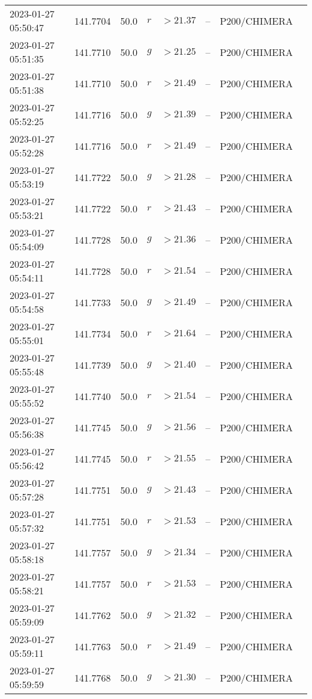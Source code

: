 \documentclass{nature_plusfigure}
\begin{document}
\begin{supplement}
\begin{center}
\begin{longtable}{llllllll}
2023-01-27 05:50:47 & 141.7704 & 50.0 & $r$ & $>21.37$ & -- & P200/CHIMERA &  \\ 
2023-01-27 05:51:35 & 141.7710 & 50.0 & $g$ & $>21.25$ & -- & P200/CHIMERA &  \\ 
2023-01-27 05:51:38 & 141.7710 & 50.0 & $r$ & $>21.49$ & -- & P200/CHIMERA &  \\ 
2023-01-27 05:52:25 & 141.7716 & 50.0 & $g$ & $>21.39$ & -- & P200/CHIMERA &  \\ 
2023-01-27 05:52:28 & 141.7716 & 50.0 & $r$ & $>21.49$ & -- & P200/CHIMERA &  \\ 
2023-01-27 05:53:19 & 141.7722 & 50.0 & $g$ & $>21.28$ & -- & P200/CHIMERA &  \\ 
2023-01-27 05:53:21 & 141.7722 & 50.0 & $r$ & $>21.43$ & -- & P200/CHIMERA &  \\ 
2023-01-27 05:54:09 & 141.7728 & 50.0 & $g$ & $>21.36$ & -- & P200/CHIMERA &  \\ 
2023-01-27 05:54:11 & 141.7728 & 50.0 & $r$ & $>21.54$ & -- & P200/CHIMERA &  \\ 
2023-01-27 05:54:58 & 141.7733 & 50.0 & $g$ & $>21.49$ & -- & P200/CHIMERA &  \\ 
2023-01-27 05:55:01 & 141.7734 & 50.0 & $r$ & $>21.64$ & -- & P200/CHIMERA &  \\ 
2023-01-27 05:55:48 & 141.7739 & 50.0 & $g$ & $>21.40$ & -- & P200/CHIMERA &  \\ 
2023-01-27 05:55:52 & 141.7740 & 50.0 & $r$ & $>21.54$ & -- & P200/CHIMERA &  \\ 
2023-01-27 05:56:38 & 141.7745 & 50.0 & $g$ & $>21.56$ & -- & P200/CHIMERA &  \\ 
2023-01-27 05:56:42 & 141.7745 & 50.0 & $r$ & $>21.55$ & -- & P200/CHIMERA &  \\ 
2023-01-27 05:57:28 & 141.7751 & 50.0 & $g$ & $>21.43$ & -- & P200/CHIMERA &  \\ 
2023-01-27 05:57:32 & 141.7751 & 50.0 & $r$ & $>21.53$ & -- & P200/CHIMERA &  \\ 
2023-01-27 05:58:18 & 141.7757 & 50.0 & $g$ & $>21.34$ & -- & P200/CHIMERA &  \\ 
2023-01-27 05:58:21 & 141.7757 & 50.0 & $r$ & $>21.53$ & -- & P200/CHIMERA &  \\ 
2023-01-27 05:59:09 & 141.7762 & 50.0 & $g$ & $>21.32$ & -- & P200/CHIMERA &  \\ 
2023-01-27 05:59:11 & 141.7763 & 50.0 & $r$ & $>21.49$ & -- & P200/CHIMERA &  \\ 
2023-01-27 05:59:59 & 141.7768 & 50.0 & $g$ & $>21.30$ & -- & P200/CHIMERA &  \\ 

\end{longtable}
\end{center}
\end{supplement}
\end{document}
